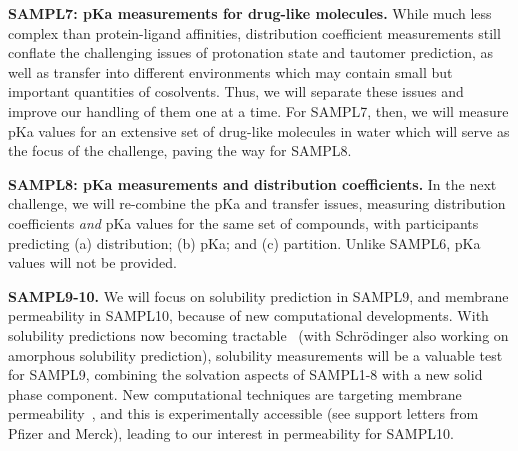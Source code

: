 \documentclass[11pt]{article}
\begin{document}
\textbf{SAMPL7: pKa measurements for drug-like molecules.} 
While much less complex than protein-ligand affinities, distribution coefficient measurements still conflate the challenging issues of protonation state and tautomer prediction, as well as transfer into different environments which may contain small but important quantities of cosolvents. 
Thus, we will separate these issues and improve our handling of them one at a time. 
For SAMPL7, then, we will measure pKa values for an extensive set of drug-like molecules in water which will serve as the focus of the challenge, paving the way for SAMPL8.

\textbf{SAMPL8: pKa measurements and distribution coefficients.}
In the next challenge, we will re-combine the pKa and transfer issues, measuring distribution coefficients \emph{and} pKa values for the same set of compounds, with participants predicting (a) distribution; (b) pKa; and (c) partition. 
Unlike SAMPL6, pKa values will not be provided.

\textbf{SAMPL9-10.}
We will focus on solubility prediction in SAMPL9, and membrane permeability in SAMPL10, because of new computational developments.
With solubility predictions now becoming tractable~\cite{Schnieders:2012:J.Chem.TheoryComput., park_absolute_2014, liu_using_2016} (with Schr\"{o}dinger also working on amorphous solubility prediction), solubility measurements will be a valuable test for SAMPL9, combining the solvation aspects of SAMPL1-8 with a new solid phase component.
New computational techniques are targeting membrane permeability~\cite{lee_permeability_2016, comer_permeability_2014}, and this is experimentally accessible (see support letters from Pfizer and Merck), leading to our interest in permeability for SAMPL10.
  
\end{document}
